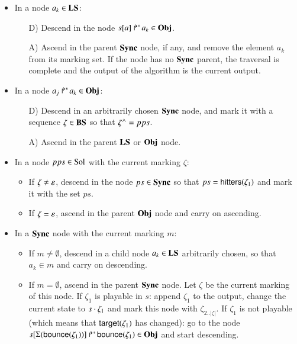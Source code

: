 \begin{itemize}
  \item In a node $a_k \in \mathbf{LS}$:
    \begin{itemize}
      \item[D)] Descend in the node $\mbox{${s[a]}\Rsh^*\!a_k$} \in \mathbf{Obj}$.
      \item[A)] Ascend in the parent $\mathbf{Sync}$ node, if any,
        and remove the element $a_k$ from its marking set.
        If the node has no $\mathbf{Sync}$ parent, the traversal is complete
        and the output of the algorithm is the current output.
    \end{itemize}
  
  \item In a node $\mbox{$a_j\Rsh^*\!a_k$} \in \mathbf{Obj}$:
    \begin{itemize}
      \item[D)] Descend in an arbitrarily chosen $\mathbf{Sync}$ node,
        and mark it with a sequence $\zeta \in \mathbf{BS}$ so that $\zeta^\wedge = pps$.
      \item[A)] Ascend in the parent $\mathbf{LS}$ or $\mathbf{Obj}$ node.
    \end{itemize}
  
  \item In a node $pps \in \mathrm{Sol}$ with the current marking $\zeta$:
    \begin{itemize}
      \item If $\zeta \neq \varepsilon$,
        descend in the node $ps \in \mathbf{Sync}$
        so that $ps = \mathsf{hitters}(\zeta_1)$
        and mark it with the set $ps$.
      \item If $\zeta = \varepsilon$,
        ascend in the parent $\mathbf{Obj}$ node and carry on ascending.
    \end{itemize}
  
  \item In a $\mathbf{Sync}$ node with the current marking $m$:
    \begin{itemize}
      \item If $m \neq \emptyset$,
        descend in a child node $a_k \in \mathbf{LS}$ arbitrarily chosen,
        so that $a_k \in m$ and carry on descending.
      \item If $m = \emptyset$,
        ascend in the parent $\mathbf{Sync}$ node.
        Let $\zeta$ be the current marking of this node.
        If $\zeta_1$ is playable in $s$:
          append $\zeta_1$ to the output,
          change the current state to $s \cdot \zeta_1$
          and mark this node with $\zeta_{2..|\zeta|}$.
        If $\zeta_1$ is not playable
        (which means that $\mathsf{target}(\zeta_1)$ has changed):
          go to the node $\mbox{${s[\Sigma(\mathsf{bounce}(\zeta_1))]}\Rsh^*\!\mathsf{bounce}(\zeta_1)$} \in \mathbf{Obj}$
          and start descending.
    \end{itemize}
\end{itemize}



